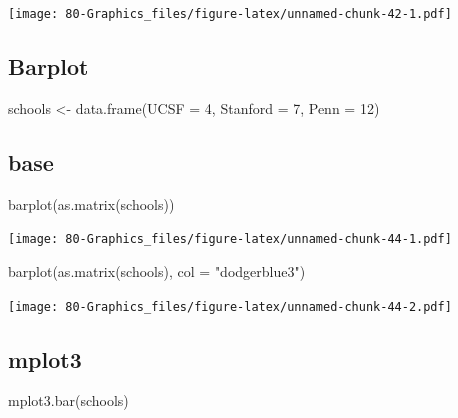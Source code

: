 \documentclass[
]{book}
\newenvironment{Shaded}{\begin{snugshade}}{\end{snugshade}}
\newcommand{\AttributeTok}[1]{\textcolor[rgb]{0.77,0.63,0.00}{#1}}
\newcommand{\DecValTok}[1]{\textcolor[rgb]{0.00,0.00,0.81}{#1}}
\newcommand{\FunctionTok}[1]{\textcolor[rgb]{0.00,0.00,0.00}{#1}}
\newcommand{\NormalTok}[1]{#1}
\newcommand{\OtherTok}[1]{\textcolor[rgb]{0.56,0.35,0.01}{#1}}
\newcommand{\StringTok}[1]{\textcolor[rgb]{0.31,0.60,0.02}{#1}}
\begin{document}
\texttt{[image: 80-Graphics\_files/figure-latex/unnamed-chunk-42-1.pdf]}

\hypertarget{barplot}{%
\subsection{Barplot}\label{barplot}}

\begin{Shaded}
\begin{Highlighting}[]
\NormalTok{schools }\OtherTok{\textless{}{-}} \FunctionTok{data.frame}\NormalTok{(}\AttributeTok{UCSF =} \DecValTok{4}\NormalTok{, }\AttributeTok{Stanford =} \DecValTok{7}\NormalTok{, }\AttributeTok{Penn =} \DecValTok{12}\NormalTok{)}
\end{Highlighting}
\end{Shaded}

\hypertarget{base-5}{%
\subsection{base}\label{base-5}}

\begin{Shaded}
\begin{Highlighting}[]
\FunctionTok{barplot}\NormalTok{(}\FunctionTok{as.matrix}\NormalTok{(schools))}
\end{Highlighting}
\end{Shaded}

\texttt{[image: 80-Graphics\_files/figure-latex/unnamed-chunk-44-1.pdf]}

\begin{Shaded}
\begin{Highlighting}[]
\FunctionTok{barplot}\NormalTok{(}\FunctionTok{as.matrix}\NormalTok{(schools), }\AttributeTok{col =} \StringTok{"dodgerblue3"}\NormalTok{)}
\end{Highlighting}
\end{Shaded}

\texttt{[image: 80-Graphics\_files/figure-latex/unnamed-chunk-44-2.pdf]}

\hypertarget{mplot3-4}{%
\subsection{\texorpdfstring{\textbf{mplot3}}{mplot3}}\label{mplot3-4}}

\begin{Shaded}
\begin{Highlighting}[]
\FunctionTok{mplot3.bar}\NormalTok{(schools)}
\end{Highlighting}
\end{Shaded}
\end{document}
